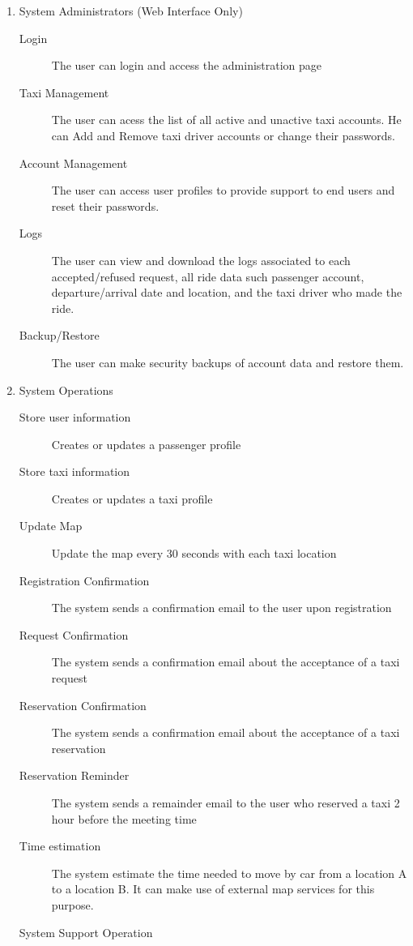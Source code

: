 \documentclass[11pt, a4paper,titlepage]{article}
\begin{document}
\begin{enumerate}
		\item System Administrators (Web Interface Only)  
			\begin{description}
				\item[Login] The user can login and access the administration page
				\item[Taxi Management] The user can acess the list of all active and unactive taxi accounts. He can Add and Remove taxi driver accounts or change their passwords.
				\item [Account Management] The user can access user profiles to provide support to end users and reset their passwords.
				\item[Logs] The user can view and download the logs associated to each accepted/refused request, all ride data such passenger account, departure/arrival date and location, and the taxi driver who made the ride.
				\item[Backup/Restore] The user can make security backups of account data and restore them.
			\end{description}
		
		\item System Operations
		\begin{description}
			\item[Store user information] Creates or updates a passenger profile
			\item[Store taxi information] Creates or updates a taxi profile
			\item[Update Map] Update the map every 30 seconds with each taxi location
			\item[Registration Confirmation] The system sends a confirmation email to the user upon registration
			\item[Request Confirmation] The system sends a confirmation email about the acceptance of a taxi request
			\item[Reservation Confirmation]  The system sends a confirmation email about the acceptance of a taxi reservation
			\item[Reservation Reminder] The system sends a remainder email to the user who reserved a taxi 2 hour before the meeting time
			\item[Time estimation] The system estimate the time needed to move by car from a location A to a location B. It can make use of external map services for this purpose.
		\end{description}
		
		\item[System Support Operation]
			
	\end{enumerate}
\end{document}
